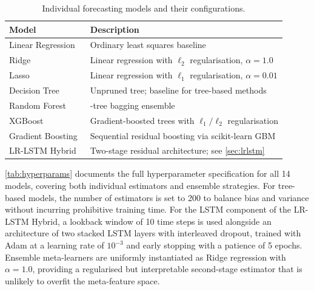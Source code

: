 \begin{table}[t]
\centering
\caption{Individual forecasting models and their configurations.\label{tab:individual_models}}
\begin{tabularx}{\textwidth}{>{\raggedright\arraybackslash}p{2.2cm} >{\raggedright\arraybackslash}X}
\toprule
\textbf{Model} & \textbf{Description} \\
\midrule
Linear Regression & Ordinary least squares baseline \\
Ridge~\parencite{hoerl1970ridge} & Linear regression with $\ell_2$ regularisation, $\alpha=1.0$ \\
Lasso~\parencite{tibshirani1996lasso} & Linear regression with $\ell_1$ regularisation, $\alpha=0.01$ \\
Decision Tree & Unpruned tree; baseline for tree-based methods \\
Random Forest~\parencite{breiman2001rf} & 200-tree bagging ensemble \\
XGBoost~\parencite{chen2016xgboost} & Gradient-boosted trees with $\ell_1/\ell_2$ regularisation \\
Gradient Boosting~\parencite{friedman2001gbm} & Sequential residual boosting via scikit-learn GBM \\
LR-LSTM Hybrid~\parencite{hochreiter1997long} & Two-stage residual architecture; see \autoref{sec:lrlstm} \\
\bottomrule
\end{tabularx}
\end{table}

\autoref{tab:hyperparams} documents the full hyperparameter specification for all 14 models, covering both individual estimators and ensemble strategies. For tree-based models, the number of estimators is set to 200 to balance bias and variance without incurring prohibitive training time. For the LSTM component of the LR-LSTM Hybrid, a lookback window of 10 time steps is used alongside an architecture of two stacked LSTM layers with interleaved dropout, trained with Adam at a learning rate of $10^{-3}$ and early stopping with a patience of 5 epochs. Ensemble meta-learners are uniformly instantiated as Ridge regression with $\alpha{=}1.0$, providing a regularised but interpretable second-stage estimator that is unlikely to overfit the meta-feature space.

